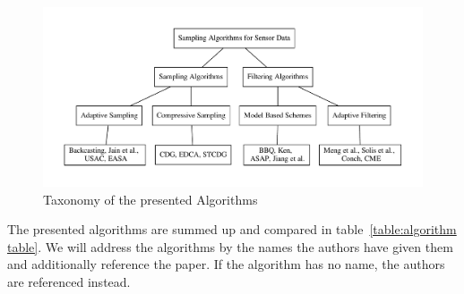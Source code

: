 \begin{figure}[h]
\includegraphics[width=\linewidth]{images/taxonomy.pdf}
\caption{Taxonomy of the presented Algorithms}
\label{fig:Taxonomy}
\centering
\end{figure}


The presented algorithms are summed up and compared in
table~\ref{table:algorithm table}. We will address the algorithms by the names
the authors have given them and additionally reference the paper. If the
algorithm has no name, the authors are referenced instead.

